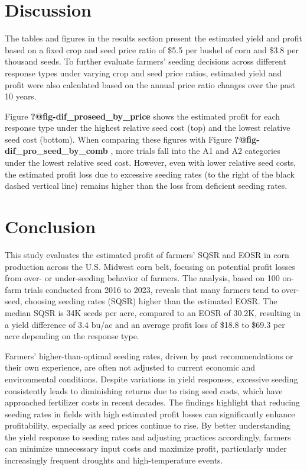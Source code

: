 \documentclass[
]{article}
\begin{document}
\section{Discussion}\label{discussion}

The tables and figures in the results section present the estimated
yield and profit based on a fixed crop and seed price ratio of \$5.5 per
bushel of corn and \$3.8 per thousand seeds. To further evaluate
farmers' seeding decisions across different response types under varying
crop and seed price ratios, estimated yield and profit were also
calculated based on the annual price ratio changes over the past 10
years.

Figure \textbf{?@fig-dif\_proseed\_by\_price} shows the estimated profit
for each response type under the highest relative seed cost (top) and
the lowest relative seed cost (bottom). When comparing these figures
with Figure \textbf{?@fig-dif\_pro\_seed\_by\_comb} , more trials fall
into the A1 and A2 categories under the lowest relative seed cost.
However, even with lower relative seed costs, the estimated profit loss
due to excessive seeding rates (to the right of the black dashed
vertical line) remains higher than the loss from deficient seeding
rates.

\section{Conclusion}\label{conclusion}

This study evaluates the estimated profit of farmers' SQSR and EOSR in
corn production across the U.S. Midwest corn belt, focusing on potential
profit losses from over- or under-seeding behavior of farmers. The
analysis, based on 100 on-farm trials conducted from 2016 to 2023,
reveals that many farmers tend to over-seed, choosing seeding rates
(SQSR) higher than the estimated EOSR. The median SQSR is 34K seeds per
acre, compared to an EOSR of 30.2K, resulting in a yield difference of
3.4 bu/ac and an average profit loss of \$18.8 to \$69.3 per acre
depending on the response type.

Farmers' higher-than-optimal seeding rates, driven by past
recommendations or their own experience, are often not adjusted to
current economic and environmental conditions. Despite variations in
yield responses, excessive seeding consistently leads to diminishing
returns due to rising seed costs, which have approached fertilizer costs
in recent decades. The findings highlight that reducing seeding rates in
fields with high estimated profit losses can significantly enhance
profitability, especially as seed prices continue to rise. By better
understanding the yield response to seeding rates and adjusting
practices accordingly, farmers can minimize unnecessary input costs and
maximize profit, particularly under increasingly frequent droughts and
high-temperature events.
\end{document}
